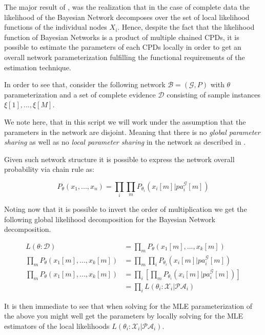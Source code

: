 \documentclass[11pt]{article}
\begin{document}
\begin{article}
The major result of \cite{spiegelhalter1990sequential}, was the
realization that in the case of complete data the likelihood of the
Bayesian Network decomposes over the set of local likelihood
functions of the individual nodes \(X_i\). Hence, despite the fact
that the likelihood function of Bayesian Networks is a product of
multiple chained CPDs, it is possible to estimate the parameters of
each CPDs locally in order to get an overall network
parameterization fulfilling the functional requirements of the
estimation technique.

In order to see that, consider the following network \(\mathscr{B} =
  (\mathscr{G}, P)\) with \(\theta\) parameterization and a set of complete
evidence \(\mathcal{D}\) consisting of sample instances \(\xi[1], ...,
  \xi[M]\).

We note here, that in this script we will work under the
assumption that the parameters in the network are disjoint. Meaning
that there is no \emph{global parameter sharing} as well as no \emph{local
parameter sharing} in the network as described in
\cite{koller2009probabilistic}.

Given such network structure it is possible to express the network
overall probability via chain rule as:

\begin{equation} \label{eq:global_decomposition}
P_{\theta} (x_1, ..., x_n) = \prod_i \prod_m P_{\theta_i}(x_i[m] | pa_i^{\mathscr{G}}[m])  \nonumber
\end{equation}

Noting now that it is possible to invert the order of multiplication
we get the following global likelihood decomposition for the
Bayesian Network decomposition. 

\begin{align} \label{eq:global_decomposition}
L(\theta : \mathcal{D})       &= \prod_m P_{\theta} (x_1[m], ..., x_k[m]) \nonumber \\ 
\prod_m P_{\theta} (x_1[m], ..., x_k[m]) &= \prod_m \prod_i  P_{\theta_i}(x_i[m] | pa_i^{\mathscr{G}}[m])  \nonumber \\
\prod_m P_{\theta} (x_1[m], ..., x_k[m]) &= \prod_i [\prod_m  P_{\theta_i}(x_i[m] | pa_i^{\mathscr{G}}[m])]  \nonumber \\
                              &= \prod_i L(\theta_i : \mathcal{X}_i | \mathcal{PA}_i)  \nonumber    
\end{align}

It is then immediate to see that when solving for the MLE
parameterization of the above you might well get the parameters by
locally solving for the MLE estimators of the local likelihoods
\(L(\theta_i : \mathcal{X}_i | \mathcal{PA}_i)\).


\end{article}
\end{document}
